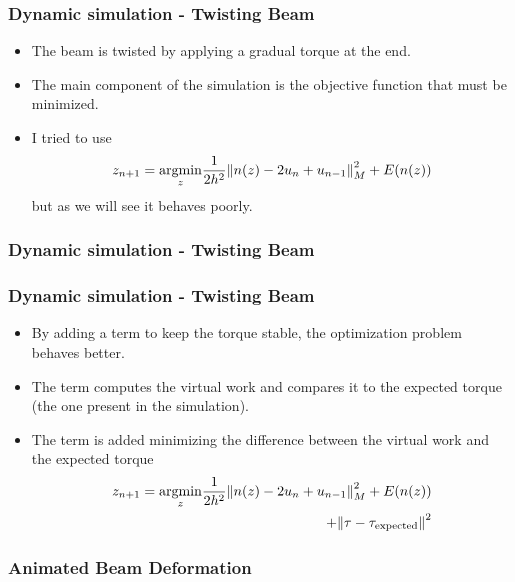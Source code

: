 \documentclass{beamer}
\DeclareMathOperator{\argmin}{argmin}
\begin{document}
\begin{frame}
    \frametitle{Dynamic simulation - Twisting Beam}
    \begin{itemize}
        \item The beam is twisted by applying a gradual torque at the end.
        \item The main component of the simulation is the objective function that must be minimized.
        \item I tried to use 
        \[
              z_{n+1} = \underset{z}{\argmin}  \frac{1}{2h^2} \norm{n(z) - 2u_n + u_{n-1}}^2_M + E(n(z))
        \]
        but as we will see it behaves poorly.
    \end{itemize}
\end{frame}

\begin{frame}
    \frametitle{Dynamic simulation - Twisting Beam}
    \begin{center}
    \end{center}
\end{frame}

\begin{frame}
    \frametitle{Dynamic simulation - Twisting Beam}
    \begin{itemize}
        \item By adding a term to keep the torque stable, the optimization problem behaves better.
        \item The term computes the virtual work and compares it to the expected torque (the one present in the simulation).
        \item The term is added minimizing the difference between the virtual work and the expected torque
        \[
            \begin{split}
                z_{n+1} = \underset{z}{\argmin}  \frac{1}{2h^2} \norm{n(z) - 2u_n + u_{n-1}}^2_M + E(n(z)) \\ + \norm{\tau - \tau_{\text{expected}}}^2
            \end{split}
        \]
    \end{itemize}
\end{frame}

\begin{frame}
    \frametitle{Animated Beam Deformation}
    \begin{center}
    \end{center}
\end{frame}
\end{document}
